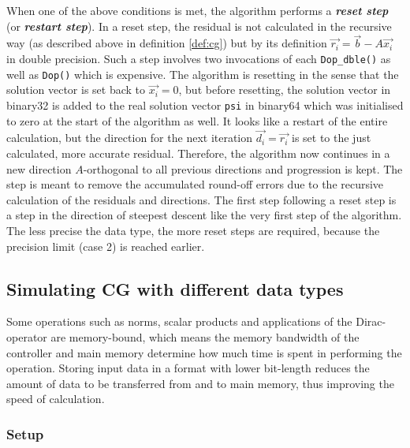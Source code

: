 \documentclass{article}
\theoremstyle{plain} %
\theoremstyle{convention} %
\theoremstyle{remark} %
\def\code#1{\texttt{#1}}
\def\df#1{\textbf{\textit{#1}}}
\numberwithin{equation}{section}
\begin{document}
When one of the above conditions is met, the algorithm performs a \df{reset step} (or \df{restart step}). In a reset step, the residual is not calculated in the recursive way (as described above in definition \eqref{def:cg}) but by its definition $\vec{r_i} = \vec{b} - A \vec{x_i}$ in double precision. Such a step involves two invocations of each \code{Dop\_dble()} as well as \code{Dop()} which is expensive. The algorithm is resetting in the sense that the solution vector is set back to $\vec{x_i} = 0$, but before resetting, the solution vector in \gls{binary32} is added to the real solution vector \code{psi} in \gls{binary64} which was initialised to zero at the start of the algorithm as well. It looks like a restart of the entire calculation, but the direction for the next iteration $\vec{d_i} = \vec{r_i}$ is set to the just calculated, more accurate residual. Therefore, the algorithm now continues in a new direction $A$-orthogonal to all previous directions and progression is kept. The step is meant to remove the accumulated round-off errors due to the recursive calculation of the residuals and directions. The first step following a reset step is a step in the direction of steepest descent like the very first step of the algorithm. The less precise the data type, the more reset steps are required, because the precision limit (case 2) is reached earlier.

\subsection{Simulating CG with different data types}

\label{sec:simulating_cgne}

Some operations such as norms, scalar products and applications of the Dirac-operator are memory-bound, which means the memory bandwidth of the controller and main memory determine how much time is spent in performing the operation. Storing input data in a format with lower bit-length reduces the amount of data to be transferred from and to main memory, thus improving the speed of calculation.

\subsubsection{Setup}
\end{document}

